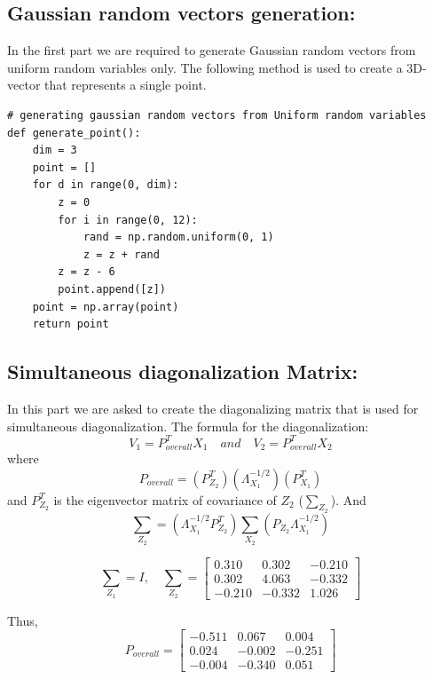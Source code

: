 \documentclass[11pt, oneside]{article}   	%
\begin{document}
\subsection{Gaussian random vectors generation:}
In the first part we are required to generate Gaussian random vectors from uniform random variables only. The following method is used to create a 3D-vector that represents a single point.
\begin{lstlisting}[label={list:first},caption=Gaussian vector generation]
# generating gaussian random vectors from Uniform random variables
def generate_point():
    dim = 3
    point = []
    for d in range(0, dim):
        z = 0
        for i in range(0, 12):
            rand = np.random.uniform(0, 1)
            z = z + rand
        z = z - 6
        point.append([z])
    point = np.array(point)
    return point
\end{lstlisting}


\subsection{Simultaneous diagonalization  Matrix:}
In this part we are asked to create the diagonalizing matrix that is used for simultaneous diagonalization. The formula for the diagonalization:
$$ V_1 = P_{overall}^T X_1 \quad and \quad V_2 = P_{overall}^T X_2$$
where 
$$P_{overall} = (P_{Z_2}^T)  (\Lambda_{X_1}^{-1/2}) (P_{X_1}^T)$$ 
and $P_{Z_2}^T$ is the eigenvector matrix of covariance of $Z_2$ ($\sum_{Z_2}$). And 
$$\sum_{Z_2} = (\Lambda_{X_1}^{-1/2}P_{Z_2}^T) \sum_{X_2} (P_{Z_2} \Lambda_{X_1}^{-1/2})$$

$$\sum_{Z_1} = I, \quad \sum_{Z_2} = \begin{bmatrix}
0.310 & 0.302 & -0.210 \\
0.302 & 4.063 & -0.332 \\
-0.210 & -0.332 & 1.026 
\end{bmatrix}$$

Thus, $$P_{overall} = \begin{bmatrix}
-0.511 & 0.067 & 0.004 \\
0.024 & -0.002 & -0.251 \\
-0.004 & -0.340 & 0.051 
\end{bmatrix}$$
\end{document}
